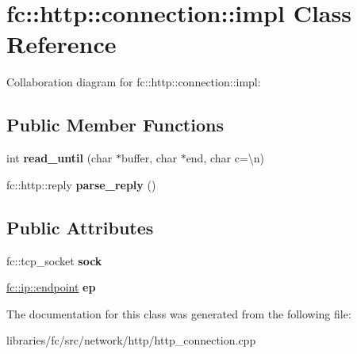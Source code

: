 \hypertarget{classfc_1_1http_1_1connection_1_1impl}{}\section{fc\+:\+:http\+:\+:connection\+:\+:impl Class Reference}
\label{classfc_1_1http_1_1connection_1_1impl}


Collaboration diagram for fc\+:\+:http\+:\+:connection\+:\+:impl\+:
\subsection*{Public Member Functions}
\begin{DoxyCompactItemize}
\item 
\mbox{\label{classfc_1_1http_1_1connection_1_1impl_ab6554d69928b5631d02df9f48268e6e1}} 
int {\bfseries read\+\_\+until} (char $\ast$buffer, char $\ast$end, char c=\textquotesingle{}\textbackslash{}n\textquotesingle{})
\item 
\mbox{\label{classfc_1_1http_1_1connection_1_1impl_a9d6e4ec54cb9a15ab64372e5d288404e}} 
fc\+::http\+::reply {\bfseries parse\+\_\+reply} ()
\end{DoxyCompactItemize}
\subsection*{Public Attributes}
\begin{DoxyCompactItemize}
\item 
\mbox{\label{classfc_1_1http_1_1connection_1_1impl_a082c4f4aa9ea45df59904c89fef293ab}} 
fc\+::tcp\+\_\+socket {\bfseries sock}
\item 
\mbox{\label{classfc_1_1http_1_1connection_1_1impl_ae790b878cb9ddf27c581c36dd65cef23}} 
\mbox{\hyperlink{classfc_1_1ip_1_1endpoint}{fc\+::ip\+::endpoint}} {\bfseries ep}
\end{DoxyCompactItemize}


The documentation for this class was generated from the following file\+:\begin{DoxyCompactItemize}
\item 
libraries/fc/src/network/http/http\+\_\+connection.\+cpp\end{DoxyCompactItemize}
